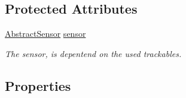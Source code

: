 \subsection*{Protected Attributes}
\begin{DoxyCompactItemize}
\item 
\hyperlink{class_a_rdev_kit_1_1_model_1_1_project_1_1_abstract_sensor}{Abstract\-Sensor} \hyperlink{class_a_rdev_kit_1_1_model_1_1_project_1_1_project_a835cbe6aaacc0f7b0a60a1dd5745667e}{sensor}
\begin{DoxyCompactList}\small\item\em The sensor, is depentend on the used trackables. \end{DoxyCompactList}\end{DoxyCompactItemize}
\subsection*{Properties}
